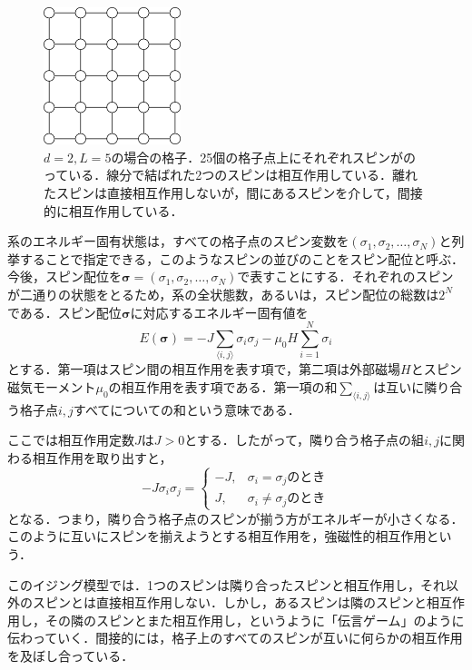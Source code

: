 \documentclass[a4paper,11pt]{jsreport}
\begin{document}
\begin{figure}[H]
   \begin{center}
       \includegraphics[height=4cm]{image/2次元格子.png}
       \caption{$d=2, L=5$の場合の格子．25個の格子点上にそれぞれスピンがのっている．線分で結ばれた2つのスピンは相互作用している．離れたスピンは直接相互作用しないが，間にあるスピンを介して，間接的に相互作用している．}
   \end{center}
\end{figure}

系のエネルギー固有状態は，すべての格子点のスピン変数を$(\sigma_1, \sigma_2, \dots, \sigma_N)$と列挙することで指定できる，このようなスピンの並びのことをスピン配位と呼ぶ．今後，スピン配位を$\bm{\sigma}=(\sigma_1, \sigma_2, \dots, \sigma_N)$で表すことにする．それぞれのスピンが二通りの状態をとるため，系の全状態数，あるいは，スピン配位の総数は$2^N$である．スピン配位$\bm{\sigma}$に対応するエネルギー固有値を
\begin{equation}
  E(\bm{\sigma}) = -J \sum_{\langle i, j \rangle} \sigma_i \sigma_j
  - \mu_0 H \sum_{i=1}^{N} \sigma_i \label{イジングエネルギー}
\end{equation}
とする．第一項はスピン間の相互作用を表す項で，第二項は外部磁場$H$とスピン磁気モーメント$\mu_0$の相互作用を表す項である．第一項の和$\sum_{\langle i, j \rangle}$は互いに隣り合う格子点$i,j$すべてについての和という意味である．\par
ここでは相互作用定数$J$は$J>0$とする．したがって，隣り合う格子点の組$i,j$に関わる相互作用を取り出すと，
\begin{equation}
  -J \sigma_i \sigma_j =
  \begin{cases}
    -J, & \sigma_i = \sigma_j \text{のとき}    \\
    J,  & \sigma_i \neq \sigma_j \text{のとき}
  \end{cases} \label{相互作用項場合分け}
\end{equation}
となる．つまり，隣り合う格子点のスピンが揃う方がエネルギーが小さくなる．このように互いにスピンを揃えようとする相互作用を，強磁性的相互作用という．\par
このイジング模型では．1つのスピンは隣り合ったスピンと相互作用し，それ以外のスピンとは直接相互作用しない．しかし，あるスピンは隣のスピンと相互作用し，その隣のスピンとまた相互作用し，というように「伝言ゲーム」のように伝わっていく．間接的には，格子上のすべてのスピンが互いに何らかの相互作用を及ぼし合っている．
\end{document}
